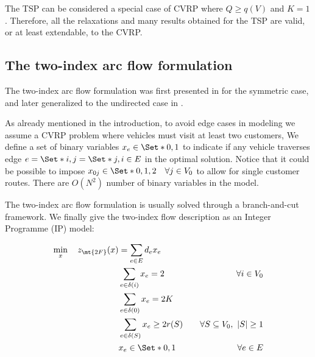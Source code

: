 The TSP can be considered a special case of CVRP where $Q \ge q(V)$ and $K = 1$.
Therefore, all the relaxations and many results obtained for the TSP are valid, or at least extendable, to the CVRP.

\subsection{The two-index arc flow formulation}
\label{sec:intro-cvrp-two-index-flow-formulation}

The two-index arc flow formulation was first presented in \cite{laporte1983, laporte1985} for the symmetric case,
and later generalized to the undirected case in \cite{laporte1986}.

As already mentioned in the introduction,
to avoid edge cases in modeling we assume a CVRP problem where
vehicles must visit at least two customers,
We define a set of binary variables $x_e \in \Set*{0, 1}$ to indicate if any vehicle traverses
edge $e = \Set*{i, j} = \Set*{j, i} \in E$ in the optimal solution.
Notice that it could be possible to impose $x_{0j} \in \Set*{0, 1, 2} \quad \forall j \in V_0$
to allow for single customer routes.
There are $O(N^2)$ number of binary variables in the model.

The two-index arc flow formulation is usually solved through a branch-and-cut framework.
We finally give the two-index flow description as an Integer Programme (IP) model:



\begin{align}
	\min_{x} \quad z_\mt{2F}(x) & = \sum_{e \in E} d_e x_e \label{eq:two-index-flow-obj-func}                                                                                     \\
	                            & \sum_{e \in \delta(i)} x_e = 2                              & \quad \forall i \in V_0 \label{eq:two-index-flow-two-edges-incident-per-customer} \\
	                            & \sum_{e \in \delta(0)} x_e = 2 K                            & \label{eq:two-index-flow-two-k-edges-incident-in-the-depot-node}                  \\
	                            & \sum_{e \in \delta(S)} x_e \ge 2 r(S)                       & \quad \forall S \subseteq V_0,\ |S| \ge 1 \label{eq:two-index-flow-ccc}           \\
	                            & x_e                   \in \Set*{0, 1}                       & \quad \forall e \in E \label{eq:two-index-flow-x-mip-var-bounds}
\end{align}

